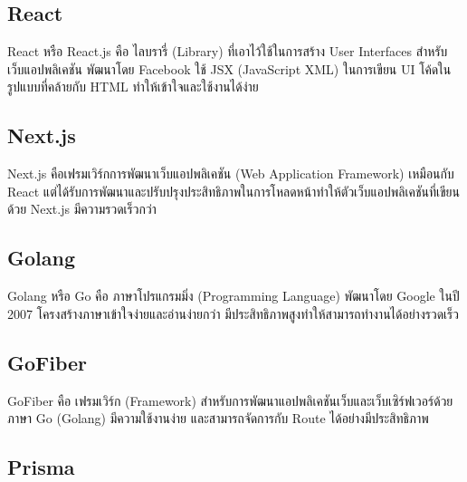 

\subsection{React}

React หรือ React.js คือ ไลบรารี่ (Library) ที่เอาไว้ใช้ในการสร้าง User Interfaces สำหรับเว็บแอปพลิเคชัน พัฒนาโดย Facebook ใช้ JSX (JavaScript XML) ในการเขียน UI โค้ดในรูปแบบที่คล้ายกับ HTML ทำให้เข้าใจและใช้งานได้ง่าย \cite{ReadyToReactWithJSX}


\subsection{Next.js}

Next.js คือเฟรมเวิร์กการพัฒนาเว็บแอปพลิเคชัน (Web Application Framework) เหมือนกับ React แต่ได้รับการพัฒนาและปรับปรุงประสิทธิภาพในการโหลดหน้าทำให้ตัวเว็บแอปพลิเคชันที่เขียนด้วย Next.js มีความรวดเร็วกว่า \cite{WhatIsNextjs}


\newpage

\subsection{Golang}

Golang หรือ Go คือ ภาษาโปรแกรมมิ่ง (Programming Language) พัฒนาโดย Google ในปี 2007 โครงสร้างภาษาเข้าใจง่ายและอ่านง่ายกว่า มีประสิทธิภาพสูงทำให้สามารถทำงานได้อย่างรวดเร็ว \cite{WhatIsGolang}


\subsection{GoFiber}

GoFiber คือ เฟรมเวิร์ก (Framework) สำหรับการพัฒนาแอปพลิเคชันเว็บและเว็บเซิร์ฟเวอร์ด้วยภาษา Go (Golang) มีความใช้งานง่าย และสามารถจัดการกับ Route ได้อย่างมีประสิทธิภาพ \cite{FiberAndGormRunGolangApp}


\subsection{Prisma}

